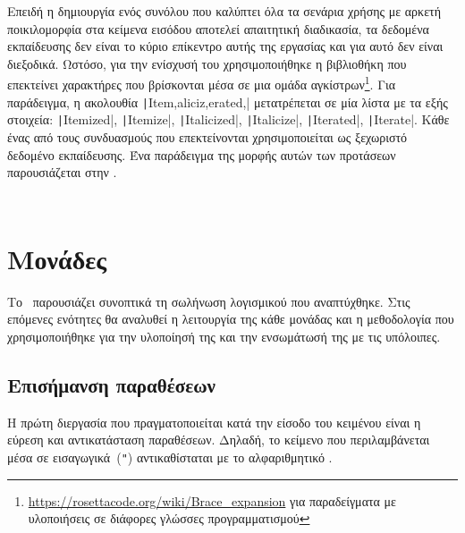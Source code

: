 Επειδή η δημιουργία ενός συνόλου που καλύπτει όλα τα σενάρια χρήσης με αρκετή ποικιλομορφία στα κείμενα εισόδου αποτελεί απαιτητική διαδικασία,
τα δεδομένα εκπαίδευσης δεν είναι το κύριο επίκεντρο αυτής της εργασίας και για αυτό δεν είναι διεξοδικά.
Ωστόσο, για την ενίσχυσή του χρησιμοποιήθηκε η βιβλιοθήκη  που επεκτείνει χαρακτήρες που βρίσκονται μέσα σε μια ομάδα αγκίστρων\footnote{\url{https://rosettacode.org/wiki/Brace_expansion} για παραδείγματα με υλοποιήσεις σε διάφορες γλώσσες προγραμματισμού}.
Για παράδειγμα, η ακολουθία \texttt|It{{em,alic}iz,erat}e{d,}| μετατρέπεται σε μία λίστα με τα εξής στοιχεία:
\texttt|Itemized|,
\texttt|Itemize|,
\texttt|Italicized|,
\texttt|Italicize|,
\texttt|Iterated|,
\texttt|Iterate|.
Κάθε ένας από τους συνδυασμούς που επεκτείνονται χρησιμοποιείται ως ξεχωριστό δεδομένο εκπαίδευσης.
Ένα παράδειγμα της μορφής αυτών των προτάσεων παρουσιάζεται στην .

\begin{listing}
    \inputminted{yaml}{../data/intent_ArmMotionOpen.yaml}
    \caption[Δήλωση της πρόθεσης \texttt{ArmMotionOpen}]{Δήλωση της πρόθεσης .
        Σημειώνεται ότι η  δεν αποτελεί ξεχωριστή ενέργεια του \metamodel{} αλλά είναι η  με .
        Αυτή η διάσπαση αναφέρεται στην .%
    }\label{lst:intent-yaml}
    \inputminted{text}{../data/utterances_ArmMotionOpen}
    \caption[Δεδομένα εκπαίδευσης για την πρόθεση \texttt{ArmMotionOpen}]{Δεδομένα εκπαίδευσης για την πρόθεση .
        Χρησιμοποιούνται διάφορα ρήματα που αντιστοιχούν σε αυτή την ενέργεια και, όπου είναι δυνατό, ομαδοποιούνται σε αγκύλες.%
    }\label{lst:utterances}
\end{listing}

\section{Μονάδες} %
Το~ παρουσιάζει συνοπτικά τη σωλήνωση λογισμικού που αναπτύχθηκε.
Στις επόμενες ενότητες θα αναλυθεί η λειτουργία της κάθε μονάδας και η μεθοδολογία που χρησιμοποιήθηκε για την υλοποίησή της και την ενσωμάτωσή της με τις υπόλοιπες.

\subsection{Επισήμανση παραθέσεων}\label{subsec:4-QuoteAnnotator}
\newcommand{\QUOTESTRING}{\engquote{\texttt{QUOTE}}}
Η πρώτη διεργασία που πραγματοποιείται κατά την είσοδο του κειμένου είναι η εύρεση και αντικατάσταση παραθέσεων.
Δηλαδή, το κείμενο που περιλαμβάνεται μέσα σε εισαγωγικά~(\texttt{"}) αντικαθίσταται με το αλφαριθμητικό \QUOTESTRING{}.

